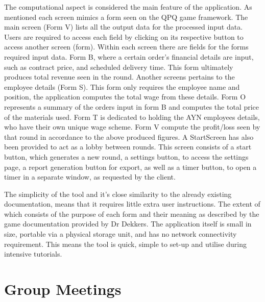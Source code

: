 \documentclass{l3proj}
\begin{document}
The computational aspect is considered the main feature of the application. As mentioned each screen mimics a form seen on the QPQ game framework. The main screen (Form V) lists all the output data for the processed input data. Users are required to access each field by clicking on its respective button to access another screen (form). Within each screen there are fields for the forms required input data. Form B, where a certain order's financial details are input, such as contract price, and scheduled delivery time. This form ultimately produces total revenue seen in the round. Another screens pertains to the employee details (Form S). This form only requires the employee name and position, the application computes the total wage from these details. Form O represents a summary of the orders input in form B and computes the total price of the materials used. Form T is dedicated to holding the AYN employees details, who have their own unique wage scheme. Form V compute the profit/loss seen by that round in accordance to the above produced figures. A StartScreen has also been provided to act as a lobby between rounds. This screen consists of a start button, which generates a new round, a settings button, to access the settings page, a report generation button for export, as well as a timer button, to open a timer in a separate window, as requested by the client.

The simplicity of the tool and it's close similarity to the already existing documentation, means that it requires little extra user instructions. The extent of which consists of the purpose of each form and their meaning as described by the game documentation provided by Dr Dekkers. The application itself is small in size, portable via a physical storage unit, and has no network connectivity requirement. This means the tool is quick, simple to set-up and utilise during intensive tutorials.
\section{Group Meetings}
\label{sec:groupmeetings}
\end{document}
